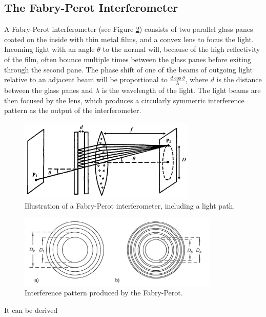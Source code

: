 \documentclass[12pt]{article}
\begin{document}
\subsection{The Fabry-Perot Interferometer}
A Fabry-Perot interferometer (see Figure \ref{fig:FP}) consists of two parallel glass panes coated on the inside with thin metal films, and a convex lens to focus the light. Incoming light with an angle $\theta$ to the normal will, because of the high reflectivity of the film, often bounce multiple times between the glass panes before exiting through the second pane. The phase shift of one of the beams of outgoing light relative to an adjacent beam will be proportional to $\frac{d \cos\theta}{\lambda}$, where $d$ is the distance between the glass panes and $\lambda$ is the wavelength of the light. The light beams are then focused by the lens, which produces a circularly symmetric interference pattern as the output of the interferometer.

\begin{figure}[h]
    \centering
    \includegraphics[width=0.75\textwidth]{figure2.png}
    \caption{Illustration of a Fabry-Perot interferometer, including a light path.\cite{manual}}
    \label{fig:FP}
\end{figure}

\begin{figure}[h!]
    \centering
    \includegraphics[width=0.85\textwidth]{rings.png}
    \caption{Interference pattern produced by the Fabry-Perot.\cite{manual}}
    \label{fig:FP}
\end{figure}

It can be derived 
\end{document}

